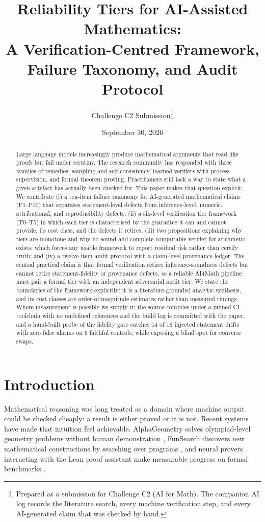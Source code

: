 \documentclass[11pt]{article}
\title{Reliability Tiers for AI-Assisted Mathematics:\\
A Verification-Centred Framework, Failure Taxonomy, and Audit Protocol}
\author{Challenge C2 Submission\thanks{Prepared as a submission for Challenge C2
(AI for Math). The companion AI log records the literature search, every machine
verification step, and every AI-generated claim that was checked by hand.}}
\date{September 30, 2026}
\theoremstyle{plain}
\theoremstyle{definition}
\newcommand{\Lean}{\textsf{Lean}}
\begin{document}
\maketitle

\begin{abstract}
Large language models increasingly produce mathematical arguments that read like
proofs but fail under scrutiny. The research community has responded with three
families of remedies: sampling and self-consistency, learned verifiers with
process supervision, and formal theorem proving. Practitioners still lack a way to
state what a given artefact has actually been checked for. This paper makes that
question explicit. We contribute (i) a ten-item failure taxonomy for AI-generated
mathematical claims (F1--F10) that separates statement-level defects from
inference-level, numeric, attributional, and reproducibility defects; (ii) a
six-level verification tier framework (T0--T5) in which each tier is characterised
by the guarantee it can and cannot provide, its cost class, and the defects it
retires; (iii) two propositions explaining why tiers are monotone and why no sound
and complete computable verifier for arithmetic exists, which forces any usable
framework to report residual risk rather than certify truth; and (iv) a twelve-item
audit protocol with a claim-level provenance ledger. The central practical claim is
that formal verification retires inference-soundness defects but cannot retire
statement-fidelity or provenance defects, so a reliable AI4Math pipeline must pair a
formal tier with an independent adversarial audit tier. We state the boundaries of
the framework explicitly: it is a literature-grounded analytic synthesis, and its cost
classes are order-of-magnitude estimates rather than measured timings. Where measurement
is possible we supply it: the source compiles under a pinned CI toolchain with no
undefined references and the build log is committed with the paper, and a hand-built
probe of the fidelity gate catches 14 of 16 injected statement drifts with zero false
alarms on 6 faithful controls, while exposing a blind spot for converse swaps.
\end{abstract}

\section{Introduction}

Mathematical reasoning was long treated as a domain where machine output could be
checked cheaply: a result is either proved or it is not. Recent systems have made
that intuition feel achievable. AlphaGeometry solves olympiad-level geometry
problems without human demonstration \citep{trinh2024alphageometry}, FunSearch
discovers new mathematical constructions by searching over programs
\citep{romera2024funsearch}, and neural provers interacting with the
\Lean{} proof assistant make measurable progress on formal benchmarks
\citep{zheng2021minif2f,yang2023leandojo,lin2024leanstar}.
\end{document}
